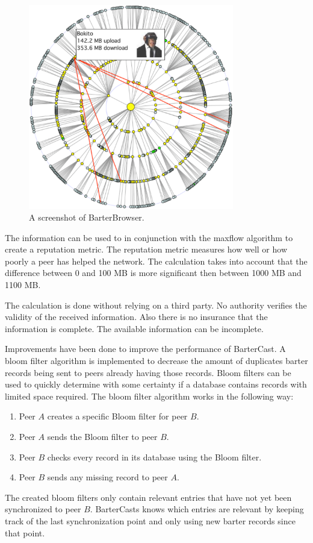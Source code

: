 \begin{figure}
	\centerline{\includegraphics[width=0.8\textwidth]{relatedWork/figs/barterBrowser.eps}}
	\caption{A screenshot of BarterBrowser\cite{pouwelse-buddycast}.}
	\label{fig:barterbrowser}
\end{figure}

The information can be used to in conjunction with the maxflow algorithm
to create a reputation metric\cite{meulpolder-bartercast-paper}.
The reputation metric measures how well or how poorly a peer has helped the network.
The calculation takes into account that the difference between 0 and 100 MB is more significant
then between 1000 MB and 1100 MB.

The calculation is done without relying on a third party.
No authority verifies the validity of the received information.
Also there is no insurance that the information is complete.
The available information can be incomplete.

Improvements have been done to improve the performance of BarterCast.
A bloom filter algorithm is implemented to decrease the amount of duplicates barter records
being sent to peers already having those records\cite{logiotatidis-splash}.
Bloom filters can be used to quickly determine with some certainty
if a database contains records with limited space required\cite{broder-bloomfilter}.
The bloom filter algorithm works in the following way:
\begin{enumerate}
    \item Peer $A$ creates a specific Bloom filter for peer $B$.
    \item Peer $A$ sends the Bloom filter to peer $B$.
    \item Peer $B$ checks every record in its database using the Bloom filter.
    \item Peer $B$ sends any missing record to peer $A$.
\end{enumerate}
The created bloom filters only contain relevant entries that have not yet been synchronized to peer $B$.
BarterCasts knows which entries are relevant by keeping track of the last synchronization point
and only using new barter records since that point.

